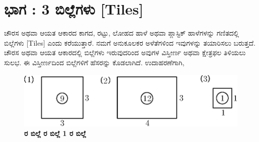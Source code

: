 

\chapter[ಭಾಗ - 3]{ಭಾಗ : 3 ಬಿಲ್ಲೆಗಳು [Tiles] }\label{chap3}


ಚೌರಸ ಅಥವಾ ಆಯತ ಆಕಾರದ ಕಾಗದ, ರಟ್ಟು, ಲೋಹದ ಹಾಳೆ ಅಥವಾ ಪ್ಲಾಸ್ಟಿಕ್ ಹಾಳೆಗಳನ್ನು ಗಣಿತದಲ್ಲಿ ಬಿಲ್ಲೆಗಳು [Tiles] ಎಂದು ಕರೆಯುತ್ತಾರೆ. ನಮಗೆ ಅನುಕೂಲಕರ ಅಳೆತೆಗಳಿಂದ ಇವುಗಳನ್ನು ತಯಾರಿಸಲು ಬರುತ್ತದೆ. ಚೌರಸ ಅಥವಾ ಆಯತ ಆಕಾರದಲ್ಲಿ ಬಿಲ್ಲೆಗಳು ಇರುವುದರಿಂದ ಅವುಗಳ ವಿಸ್ತೀರ್ಣ ಅಥವಾ ಕ್ಷೇತ್ರಫಲ ತಿಳಿಯಲು ಸುಲಭ. ಈ ವಿಸ್ತೀರ್ಣದಿಂದ ಬಿಲ್ಲೆಗಳಿಗೆ ಹೆಸರನ್ನು ಕೊಡಲಾಗಿದೆ. ಉದಾಹರಣೆಗಾಗಿ, 
\begin{figure}[H]
\centering
\includegraphics[scale=0.8]{src/figure/chap3/fig3-1.eps}\\
\textbf{ ರ ಬಿಲ್ಲೆ  \hspace{1.5cm}  ರ ಬಿಲ್ಲೆ \hspace{2cm} 1 ರ ಬಿಲ್ಲೆ }
\end{figure}

